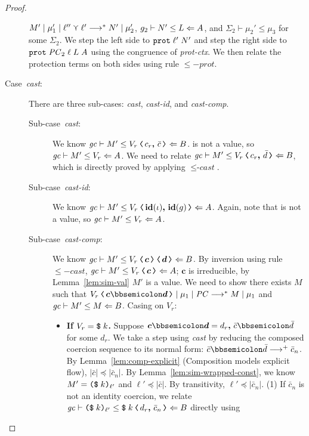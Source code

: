 \begin{proof}
\begin{description}
  ${M'}\mid{\mu_1'}\mid{\ell'' \curlyvee \ell'}\longrightarrow^{*}{N'}\mid{\mu_2'}$,
  ${g_2}\vdash{N'}\leq{L}\Leftarrow{A}$, and $\Sigma_2 \vdash \mu_2' \leq \mu_3$ for some $\Sigma_2$.
  We step the left side to $\text{\texttt{{prot}}}\;{\ell'}\;{N'}$ and step the right side to
  $\text{\texttt{{prot}}}\;{\mathit{PC}_2}\;{\ell}\;{L}\;{A}$ using the congruence of \textit{prot-ctx}.
  We then relate the protection terms on both sides using rule ${\leq}\mathit{-prot}$.
  \item[Case~\textit{cast}:] There are three sub-cases: \textit{cast}, \textit{cast-id},
  and \textit{cast-comp}.
    \begin{description}
    \item[Sub-case~\textit{cast}:]
    We know $\simrel{\gc}{M'}{\cccast{V_r}{\coerc{c_r}{\bar{c}}}}{B}$. 
    is not a value, so ${\mathit{gc}}\vdash{M'}\leq{V_r}\Leftarrow{A}$. We need to relate
    $\simrel{\gc}{M'}{\cccast{V_r}{\coerc{c_r}{\bar{d}}}}{B}$, which is directly proved by applying
    ${\leq}\textit{-cast}$.
    \item[Sub-case~\textit{cast-id}:]
    We know $\simrel{\gc}{M'}{\cccast{V_r}{\coerc{\id{\iota}}{\id{g}}}}{A}$. Again, note that
     is not a value, so ${\mathit{gc}}\vdash{M'}\leq{V_r}\Leftarrow{A}$.
    \item[Sub-case~\textit{cast-comp}:]
    We know $\simrel{\gc}{M'}{\cccast{\cccast{V_r}{\bm{c}}}{\bm{d}}}{B}$. By inversion using
    rule ${\leq}\mathit{-cast}$, $\simrel{\gc}{M'}{\cccast{V_r}{\bm{c}}}{A}$; $\bm{c}$ is irreducible,
    by Lemma~\ref{lem:sim-val} $M'$ is a value. We need to show there exists $M$ such that
    $\reducemult{\cccast{V_r}{\bm{c}\mdoubleplus\bm{d}}}{\mu_1}{\PC}{M}{\mu_1}$ and ${\mathit{gc}}\vdash{M'}\leq{M}\Leftarrow{B}$.
    Casing on $V_r$:
    \begin{itemize}
    \item \textbf{If $V_r = \text{\texttt{{\$}}}\;{k}$.} Suppose
    $\bm{c}\mdoubleplus\bm{d} = \coerc{d_r}{\bar{c} \mdoubleplus \bar{d}}$ for some $d_r$.
    We take a step using \textit{cast} by reducing the composed coercion sequence to its
    normal form: $\bar{c} \mdoubleplus \bar{d} \longrightarrow^{+} \bar{c}_n$.
    By Lemma~\ref{lem:comp-explicit} (Composition models explicit flow), $|\bar{c}| \preccurlyeq |\bar{c}_n|$.
    By Lemma~\ref{lem:sim-wrapped-const}, we know $M' = \text{\texttt{{(\$}}}\;{k}\text{\texttt{{)}}}_{\ell'}$ and $\ell' \preccurlyeq |\bar{c}|$.
    By transitivity, $\ell' \preccurlyeq |\bar{c}_n|$.
    (1) If $\bar{c}_n$ is not an identity coercion, we relate
    $\simrel{\gc}{\dynconst{k}{\ell'}}{\cccast{\ccconst{k}}{\coerc{d_r}{\bar{c}_n}}}{B}$ directly using

\end{itemize}
\end{description}
\end{description}
\end{proof}
